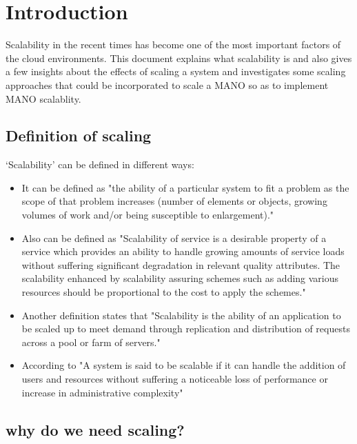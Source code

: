 \chapter{Introduction}
\label{ch:Introduction}

Scalability in the recent times has become one of the most important factors of the cloud environments. This document explains what scalability is and also gives a few insights about the effects of scaling a system and investigates some scaling approaches that could be incorporated to scale a MANO so as to implement MANO scalablity.

\section{Definition of scaling}
`Scalability' can be defined in different ways:
\begin{itemize}
	 

\item It can be defined as \cite{furht_handbook_2010}"the ability of a particular system to fit a problem as the scope of that problem increases (number of elements or objects, growing volumes of work and/or being susceptible to enlargement)."

\item Also can be defined as \cite{lee_software_2010} "Scalability of service is a desirable property of a service which provides an ability to handle growing amounts of  service loads without suffering significant degradation in relevant quality attributes. The scalability enhanced by scalability assuring schemes such as adding various resources should be proportional to the cost to apply the schemes." 

\item Another definition states that \cite{chieu_scalability_2011} "Scalability is the ability of an application to be scaled up to meet demand through replication and distribution of requests across a pool or farm of servers."

\item According to \cite{noauthor_scale_nodate}
"A system is said to be scalable if it can handle the addition of users and resources without suffering a noticeable loss of performance or increase in administrative complexity"

\end{itemize}

\section{why do we need scaling?}
